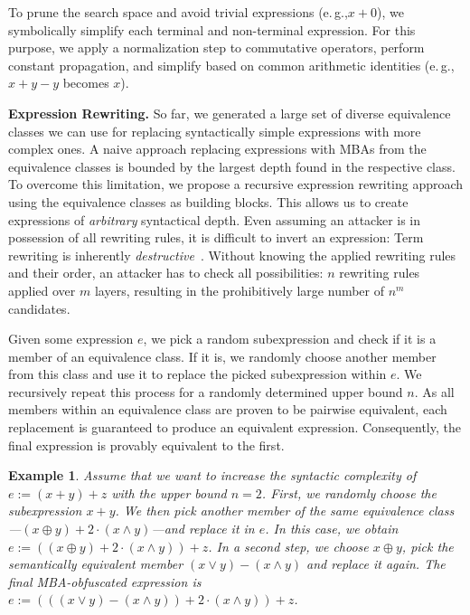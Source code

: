 \documentclass[letterpaper,twocolumn,10pt]{article}
\newcommand{\eg}{e.\,g.,\xspace}
\theoremstyle{customexample}
\newtheorem{example}{Example}
\theoremstyle{customexperiment}
\begin{document}
To prune the search space and avoid trivial expressions (\eg $x + 0$), we symbolically simplify each terminal and non-terminal expression. For this purpose, we apply a normalization step to commutative operators, 
perform constant propagation, and simplify based on common arithmetic identities (\eg $x + y - y$ becomes $x$). 



\textbf{Expression Rewriting.}
So far, we generated a large set of diverse equivalence classes we can use for replacing syntactically simple expressions with more complex ones.  A naive approach replacing expressions with MBAs from the equivalence classes is bounded by the largest depth found in the respective class. To overcome this limitation, we propose a recursive expression rewriting approach using the equivalence classes as building blocks. This allows us to create expressions of \emph{arbitrary} syntactical depth. 
Even assuming an attacker is in possession of all rewriting rules, it is difficult to invert an expression: Term rewriting is inherently \emph{destructive}~\cite{willsey2021egg}. Without knowing the applied rewriting rules and their order, an attacker has to check all possibilities: $n$ rewriting rules applied over $m$ layers, resulting in the prohibitively large number of $n^m$ candidates.



Given some expression $e$, we pick a random subexpression and check if it is a member of an equivalence class. If it is, we randomly choose another member from this class and use it to replace the picked subexpression within $e$. We recursively repeat this process for a randomly determined upper bound $n$.
As all members within an equivalence class are proven to be pairwise equivalent, each replacement is guaranteed to produce an equivalent expression. Consequently, the final expression is provably equivalent to the first.

\begin{example}
Assume that we want to increase the syntactic complexity of $e := (x + y) + z$  with the upper bound $n=2$. First, we randomly choose the subexpression $x + y$. We then pick another member of the same equivalence class---$(x \oplus y) + 2 \cdot (x \land y)$---and replace it in $e$. In this case, we obtain $e := ((x \oplus y) + 2 \cdot (x \land y)) + z$. In a second step, we choose $x\oplus y$, pick the semantically equivalent member $(x \lor y) - (x \land y)$ and replace it again. The final MBA-obfuscated expression is $e := (((x \lor y) - (x \land y)) + 2 \cdot (x \land y)) + z$.
\end{example}
\end{document}
